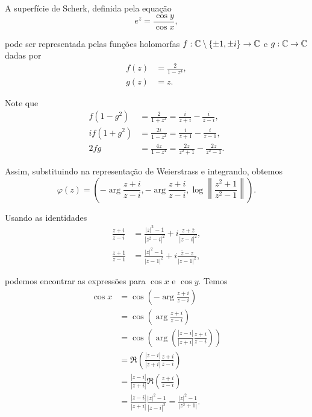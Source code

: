 \begin{exemplo}
	A superfície de Scherk, definida pela equação
	\begin{equation*}
		e^z = \frac{\cos y}{\cos x},
	\end{equation*}
	
	pode ser representada pelas funções holomorfas $f: \mathbb{C} \setminus \{\pm 1, \pm i \} \rightarrow \mathbb{C}$ e $g: \mathbb{C} \rightarrow \mathbb{C}$ dadas por
	\begin{align*}
		f(z) &= \frac{2}{1 - z^4}, \\
		g(z) &= z.
	\end{align*}
	
	Note que
	\begin{align*}
		f (1 - g^2) &= \frac{2}{1 + z^2} = \frac{i}{z + i} - \frac{i}{z - i}, \\
		i f (1 + g^2) &= \frac{2i}{1 - z^2} = \frac{i}{z + 1} - \frac{i}{z - 1}, \\
		2fg &= \frac{4z}{1 - z^4} = \frac{2z}{z^2 + 1} - \frac{2z}{z^2 - 1}.
	\end{align*}
	
	Assim, substituindo na representação de Weierstrass e integrando, obtemos
	\begin{equation*}
		\varphi(z) = \left( -\arg \frac{z + i}{z - i}, -\arg \frac{z + i}{z - i}, \log \left\| \frac{z^2 + 1}{z^2 - 1} \right\| \right).
	\end{equation*}
	
	Usando as identidades
	\begin{align*}
		\frac{z + i}{z - i} &= \frac{|z|^2 - 1}{|z^2 - i|^2} + i \frac{z + \overline{z}}{|z - i|^2}, \\
		\frac{z + 1}{z - 1} &= \frac{|z|^2 - 1}{|z - 1|^2} + i \frac{\overline{z} - z}{|z - 1|^2},
	\end{align*}
	
	podemos encontrar as expressões para $\cos x$ e $\cos y$. Temos
	\begin{align*}
		\cos x &= \cos \left( -\arg \frac{z + i}{z - i} \right) \\
		&= \cos \left( \arg \frac{z + i}{z - i} \right) \\
		&= \cos \left( \arg \left( \frac{|z - i|}{|z + i|} \frac{z + i}{z - i} \right) \right) \\
		&= \Re \left( \frac{|z - i|}{|z + i|} \frac{z + i}{z - i} \right) \\
		&= \frac{|z - i|}{|z + i|} \Re \left( \frac{z + i}{z - i} \right) \\
		&= \frac{|z - i|}{|z + i|} \frac{|z|^2 - 1}{|z - i|^2} = \frac{|z|^2 - 1}{|z^2 + 1|}.
	\end{align*}
	

\end{exemplo}
